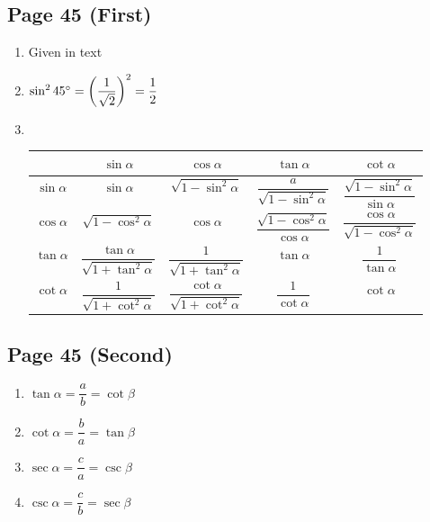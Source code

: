 \documentclass{article}
\newenvironment{solutions}[1]
{\subsection*{#1}
 \begin{enumerate}[leftmargin=1.5em]}
{\end{enumerate}}
\newcommand{\solution}{\item}
\begin{document}
\begin{solutions}{Page 45 (First)}
\solution %
Given in text

\solution %
$\sin^{2}{45\degree} = \left(\dfrac{1}{\sqrt{2}}\right)^2 = \dfrac{1}{2}$

\solution ~ %
\begin{center}
\bgroup
\def\arraystretch{2.1}
\setlength\tabcolsep{15pt}
\begin{tabular}{ |c|c|c|c|c| }
\hline
~              & $\sin{\alpha}$                                      & $\cos{\alpha}$                           & $\tan{\alpha}$                                      & $\cot{\alpha}$ \\
\hline
$\sin{\alpha}$ & $\sin{\alpha}$                                      & $\sqrt{1 - \sin^{2}{\alpha}}$            & $\dfrac{a}{\sqrt{1 - \sin^{2}{\alpha}}}$            & $\dfrac{\sqrt{1 - \sin^{2}{\alpha}}}{\sin{\alpha}}$ \\
\hline
$\cos{\alpha}$ & $\sqrt{1 - \cos^{2}{\alpha}}$                       & $\cos{\alpha}$                           & $\dfrac{\sqrt{1 - \cos^{2}{\alpha}}}{\cos{\alpha}}$ & $\dfrac{\cos{\alpha}}{\sqrt{1 - \cos^{2}{\alpha}}}$ \\
\hline
$\tan{\alpha}$ & $\dfrac{\tan{\alpha}}{\sqrt{1 + \tan^{2}{\alpha}}}$ & $\dfrac{1}{\sqrt{1 + \tan^{2}{\alpha}}}$ & $\tan{\alpha}$                                      & $\dfrac{1}{\tan{\alpha}}$ \\
\hline
$\cot{\alpha}$ & $\dfrac{1}{\sqrt{1 + \cot^{2}{\alpha}}}$            & $\dfrac{\cot{\alpha}}{\sqrt{1 + \cot^{2}{\alpha}}}$ & $\dfrac{1}{\cot{\alpha}}$                           & $\cot{\alpha}$ \\
\hline
\end{tabular}
\egroup
\end{center}
\end{solutions}


\begin{solutions}{Page 45 (Second)}
\solution $\tan{\alpha} = \dfrac{a}{b} = \cot{\beta}$
\solution $\cot{\alpha} = \dfrac{b}{a} = \tan{\beta}$
\solution $\sec{\alpha} = \dfrac{c}{a} = \csc{\beta}$
\solution $\csc{\alpha} = \dfrac{c}{b} = \sec{\beta}$
\end{solutions}
\end{document}
